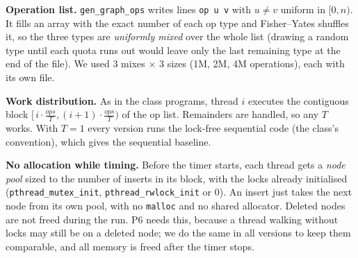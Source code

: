 \documentclass[10pt,a4paper]{article}
\begin{document}
\textbf{Operation list.} \texttt{gen\_graph\_ops} writes lines \texttt{op u v} with $u \ne v$ uniform in $[0,n)$.
It fills an array with the exact number of each op type and Fisher--Yates shuffles it, so the three types are \emph{uniformly mixed} over the whole list
(drawing a random type until each quota runs out would leave only the last remaining type at the end of the file).
We used 3 mixes $\times$ 3 sizes (1M, 2M, 4M operations), each with its own file.

\textbf{Work distribution.} As in the class programs, thread $i$ executes the contiguous block $[\,i\cdot\frac{ops}{T}, (i{+}1)\cdot\frac{ops}{T})$ of the op list.
Remainders are handled, so any $T$ works. With $T=1$ every version runs the lock-free sequential code (the class's convention), which gives the sequential baseline.

\textbf{No allocation while timing.} Before the timer starts, each thread gets a \emph{node pool} sized to the number of inserts in its block, with the locks already initialised
(\texttt{pthread\_mutex\_init}, \texttt{pthread\_rwlock\_init} or 0). An insert just takes the next node from its own pool, with no \texttt{malloc} and no shared allocator.
Deleted nodes are not freed during the run. P6 needs this, because a thread walking without locks may still be on a deleted node; we do the same in all versions to keep
them comparable, and all memory is freed after the timer stops.
\end{document}

